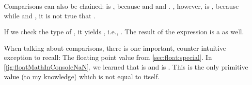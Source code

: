 Comparisons can also be chained:
 is , because  and  and .
, however, is , because while  and , it is not true that .

If we check the type of , it yields , i.e., .
The result of the expression  is a  as well.

When talking about comparisons, there is one important, counter-intuitive exception to recall:
The  floating point value from \cref{sec:float:special}.
In \cref{fig:floatMathInConsoleNaN}, we learned that \pythonIdx{==} is  and \pythonIdx{!=} is .
This is the only primitive value (to my knowledge) which is not equal to itself.%
\endhsection%
%
%
%
%
